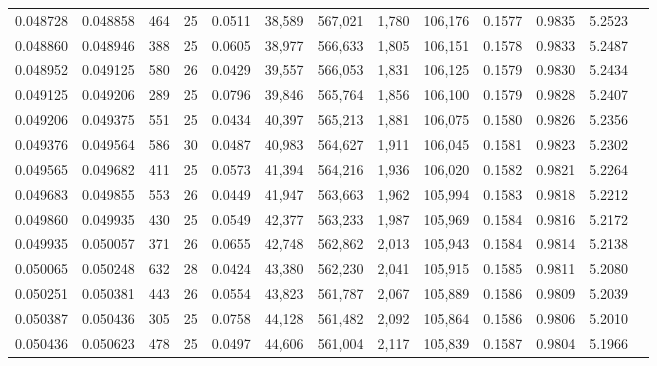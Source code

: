 \begin{tabular}{rrrrrrrrrrrrr}
0.048728 & 0.048858 & 464 &  25 &                                     0.0511 &  38,589 & 567,021 &   1,780 & 106,176 & 0.1577 & 0.9835 & 5.2523 \\
0.048860 & 0.048946 & 388 &  25 &                                     0.0605 &  38,977 & 566,633 &   1,805 & 106,151 & 0.1578 & 0.9833 & 5.2487 \\
0.048952 & 0.049125 & 580 &  26 &                                     0.0429 &  39,557 & 566,053 &   1,831 & 106,125 & 0.1579 & 0.9830 & 5.2434 \\
0.049125 & 0.049206 & 289 &  25 &                                     0.0796 &  39,846 & 565,764 &   1,856 & 106,100 & 0.1579 & 0.9828 & 5.2407 \\
0.049206 & 0.049375 & 551 &  25 &                                     0.0434 &  40,397 & 565,213 &   1,881 & 106,075 & 0.1580 & 0.9826 & 5.2356 \\
0.049376 & 0.049564 & 586 &  30 &                                     0.0487 &  40,983 & 564,627 &   1,911 & 106,045 & 0.1581 & 0.9823 & 5.2302 \\
0.049565 & 0.049682 & 411 &  25 &                                     0.0573 &  41,394 & 564,216 &   1,936 & 106,020 & 0.1582 & 0.9821 & 5.2264 \\
0.049683 & 0.049855 & 553 &  26 &                                     0.0449 &  41,947 & 563,663 &   1,962 & 105,994 & 0.1583 & 0.9818 & 5.2212 \\
0.049860 & 0.049935 & 430 &  25 &                                     0.0549 &  42,377 & 563,233 &   1,987 & 105,969 & 0.1584 & 0.9816 & 5.2172 \\
0.049935 & 0.050057 & 371 &  26 &                                     0.0655 &  42,748 & 562,862 &   2,013 & 105,943 & 0.1584 & 0.9814 & 5.2138 \\
0.050065 & 0.050248 & 632 &  28 &                                     0.0424 &  43,380 & 562,230 &   2,041 & 105,915 & 0.1585 & 0.9811 & 5.2080 \\
0.050251 & 0.050381 & 443 &  26 &                                     0.0554 &  43,823 & 561,787 &   2,067 & 105,889 & 0.1586 & 0.9809 & 5.2039 \\
0.050387 & 0.050436 & 305 &  25 &                                     0.0758 &  44,128 & 561,482 &   2,092 & 105,864 & 0.1586 & 0.9806 & 5.2010 \\
0.050436 & 0.050623 & 478 &  25 &                                     0.0497 &  44,606 & 561,004 &   2,117 & 105,839 & 0.1587 & 0.9804 & 5.1966 \\

\end{tabular}
